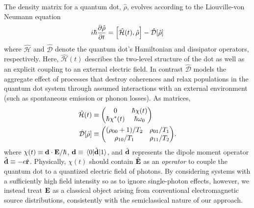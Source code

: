 \documentclass[conference]{IEEEtran}
\begin{document}
The density matrix for a quantum dot, $\hat{\rho}$, evolves according to the Liouville-von Neumann equation
\begin{equation}
  i \hbar \pdv{\hat{\rho}}{t} = \commutator{\hat{\mathcal{H}}(t)}{\hat{\rho}} - \hat{\mathcal{D}}\qty[\hat{\rho}]
  \label{eq:liouville}
\end{equation}
where $\hat{\mathcal{H}}$ and $\hat{\mathcal{D}}$ denote the quantum dot's Hamiltonian and dissipator operators, respectively\cite{Breuer2002}.
Here, $\hat{\mathcal{H}}(t)$ describes the  two-level structure of the dot as well as an explicit coupling to an external electric field.
In contrast $\hat{\mathcal{D}}$ models the aggregate effect of processes that destroy coherences and relax populations in the quantum dot system through assumed interactions with an external environment (such as spontaneous emission or phonon losses).
As matrices,
\begin{subequations}
  \begin{align}
    \hat{\mathcal{H}}(t) &\equiv \mqty(0 & \hbar \chi(t) \\ \hbar \chi^*(t) & \hbar \omega_0) \label{eq:hamiltonian} \\
    \hat{\mathcal{D}}[\hat{\rho}] &\equiv \mqty((\rho_{00} + 1)/T_2 & \rho_{01}/T_1 \\ \rho_{10}/T_1 & \rho_{11}/T_2). \label{eq:dissipator}
  \end{align}
\end{subequations}
where $\chi(t) \equiv \vb{d} \cdot \vb{E}/\hbar$, $\vb{d} \equiv \matrixel{0}{\hat{\vb{d}}}{1}$, and $\hat{\vb{d}}$ represents the dipole moment operator $\hat{\vb{d}} \equiv -e \hat{\vb{r}}$. 
Physically, $\chi(t)$ should contain $\hat{\vb{E}}$ as an \emph{operator} to couple the quantum dot to a quantized electric field of photons.
By considering systems with a sufficiently high field intensity so as to ignore single-photon effects, however, we instead treat $\vb{E}$ as a classical object arising from conventional electromagnetic source distributions, consistently with the semiclassical nature of our approach.
\end{document}
